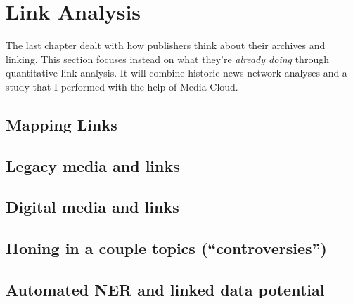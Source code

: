 \chapter{Link Analysis}


The last chapter dealt with how publishers think about their archives and linking. This section focuses instead on what they're \emph{already doing} through quantitative link analysis. It will combine historic news network analyses and a study that I performed with the help of Media Cloud.

\section{Mapping Links}


\section{Legacy media and links}

\section{Digital media and links}

\section{Honing in a couple topics (``controversies'')}


\section{Automated NER and linked data potential}

